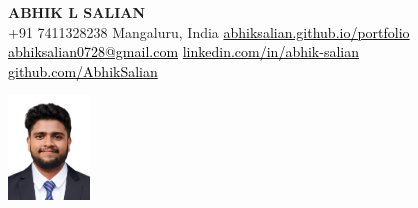\documentclass{resume} %
\begin{document}
\begin{minipage}[t]{0.745\textwidth}
    \vspace{-0.6in}
    \LARGE \textbf{ABHIK L SALIAN} 
    \vspace{0.3cm}
    \\
    \normalsize
    +91 7411328238 \textbar{} 
    Mangaluru, India \textbar{}
    \href{https://abhiksalian.github.io/portfolio/}{\textcolor{black}{abhiksalian.github.io/portfolio}} 
    \vspace{0.15cm}
    \\
    \href{mailto:abhiksalian0728@gmail.com}{\textcolor{black}{abhiksalian0728@gmail.com}} \textbar{}
    \href{https://linkedin.com/in/abhik-salian}{\textcolor{black}{linkedin.com/in/abhik-salian}} \textbar{}
    \href{https://www.github.com/AbhikSalian}{\textcolor{black}{github.com/AbhikSalian}}
\end{minipage}
\begin{minipage}[t]{0.25\textwidth}
    \vspace{-0.8in}
    \begin{flushright}
        \includegraphics[width=0.85in]{Abhik_L_Salian.png} %
    \end{flushright}
\end{minipage}


\end{document}
